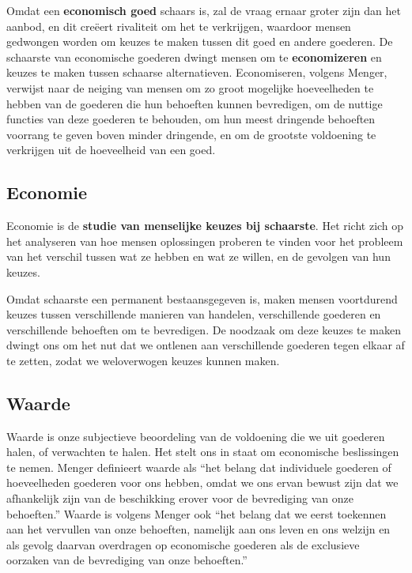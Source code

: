 Omdat een \textbf{economisch goed} schaars is, zal de vraag ernaar groter zijn dan het aanbod, en dit creëert rivaliteit om het te verkrijgen, waardoor mensen gedwongen worden om keuzes te maken tussen dit goed en andere goederen. De schaarste van economische goederen dwingt mensen om te \textbf{economizeren} en keuzes te maken tussen schaarse alternatieven. Economiseren, volgens Menger, verwijst naar de neiging van mensen om zo groot mogelijke hoeveelheden te hebben van de goederen die hun behoeften kunnen bevredigen, om de nuttige functies van deze goederen te behouden, om hun meest dringende behoeften voorrang te geven boven minder dringende, en om de grootste voldoening te verkrijgen uit de hoeveelheid van een goed.

\subsection{Economie}

Economie is de \textbf{studie van menselijke keuzes bij schaarste}. Het richt zich op het analyseren van hoe mensen oplossingen proberen te vinden voor het probleem van het verschil tussen wat ze hebben en wat ze willen, en de gevolgen van hun keuzes. 

Omdat schaarste een permanent bestaansgegeven is, maken mensen voortdurend keuzes tussen verschillende manieren van handelen, verschillende goederen en verschillende behoeften om te bevredigen. De noodzaak om deze keuzes te maken dwingt ons om het nut dat we ontlenen aan verschillende goederen tegen elkaar af te zetten, zodat we weloverwogen keuzes kunnen maken.

\subsection{Waarde}

Waarde is onze subjectieve beoordeling van de voldoening die we uit goederen halen, of verwachten te halen. Het stelt ons in staat om economische beslissingen te nemen. Menger definieert waarde als “het belang dat individuele goederen of hoeveelheden goederen voor ons hebben, omdat we ons ervan bewust zijn dat we afhankelijk zijn van de beschikking erover voor de bevrediging van onze behoeften.”\autocite{15} Waarde is volgens Menger ook “het belang dat we eerst toekennen aan het vervullen van onze behoeften, namelijk aan ons leven en ons welzijn en als gevolg daarvan overdragen op economische goederen als de exclusieve oorzaken van de bevrediging van onze behoeften.”\autocite{16}

